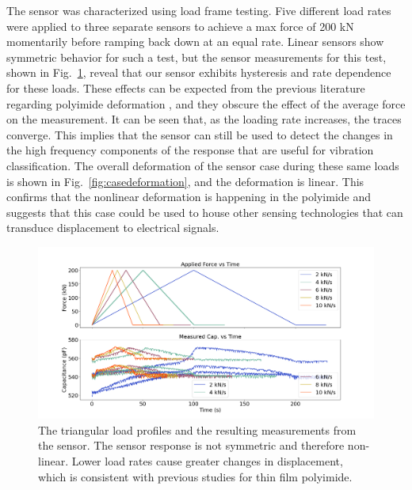 The sensor was characterized using load frame testing.
Five different load rates were applied to three separate sensors to achieve a max force of 200 kN 
 momentarily before ramping back down at an equal rate. 
Linear sensors show symmetric behavior for such a test, 
 but the sensor measurements for this test, shown in Fig.~\ref{fig:triangleload}, 
 reveal that our sensor exhibits hysteresis and rate dependence for these loads.
These effects can be expected from the previous literature regarding polyimide deformation
\cite{Khan14, VALAVALA20071161, dharmadasa20, li21, he16, wang20, chang08, wei08, zhu20, dobrzynska12, Bodini19},
 and they obscure the effect of the average force on the measurement.
It can be seen that, as the loading rate increases, the traces converge.
This implies that the sensor can still be used to detect the changes in the high frequency components 
 of the response that are useful for vibration classification.
The overall deformation of the sensor case during these same loads is shown in Fig.~\ref{fig:casedeformation},
 and the deformation is linear. 
This confirms that the nonlinear deformation is happening in the polyimide
 and suggests that this case could be used to house other sensing technologies
 that can transduce displacement to electrical signals.

\begin{figure}[t!]
\centering
\centerline{\includegraphics[width=5.5in]{figures/p1_media/Fig4.png}}
\caption{
The triangular load profiles and the resulting measurements from the sensor. 
The sensor response is not symmetric and therefore non-linear.
Lower load rates cause greater changes in displacement, which is consistent with previous studies for 
 thin film polyimide. 
}
\label{fig:triangleload}
\end{figure}

